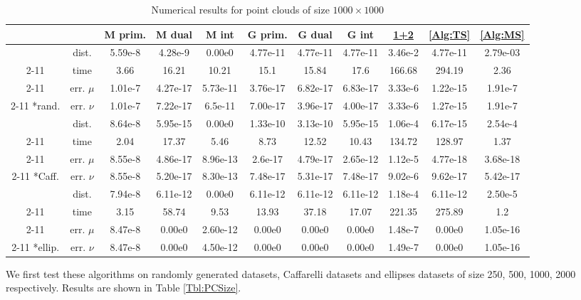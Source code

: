 \documentclass[english]{pkupaper}
\begin{document}
\begin{table}[htbp]
\centering \footnotesize
\begin{tabular}{|c|c|c|c|c|c|c|c|c|c|c|}
\hline
& & M prim. & M dual & M int & G prim. & G dual & G int & \hyperlink{EAlg:12}{1+2} & \ref{Alg:TS} & \ref{Alg:MS} \\ \hline
& dist. & 5.59e-8 & 4.28e-9 & 0.00e0 & 4.77e-11 & 4.77e-11 & 4.77e-11 & 3.46e-2 & 4.77e-11 & 2.79e-03 \\ \cline{2-11}
& time & 3.66 & 16.21 & 10.21 & 15.1 & 15.84 & 17.6 & 166.68 & 294.19 & 2.36 \\ \cline{2-11}
& err. $\mu$ & 1.01e-7 & 4.27e-17 & 5.73e-11 & 3.76e-17 & 6.82e-17 & 6.83e-17 & 3.33e-6 & 1.22e-15 & 1.91e-7 \\ \cline{2-11}
\multirow{-4}*{rand.} & err. $\nu$ & 1.01e-7 & 7.22e-17 & 6.5e-11 & 7.00e-17 & 3.96e-17 & 4.00e-17 & 3.33e-6 & 1.27e-15 & 1.91e-7 \\ \hline
& dist. & 8.64e-8 & 5.95e-15 & 0.00e0 & 1.33e-10 & 3.13e-10 & 5.95e-15 & 1.06e-4 & 6.17e-15 & 2.54e-4 \\ \cline{2-11}
& time & 2.04 & 17.37 & 5.46 & 8.73 & 12.52 & 10.43 & 134.72 & 128.97 & 1.37 \\ \cline{2-11}
& err. $\mu$ & 8.55e-8 & 4.86e-17 & 8.96e-13 & 2.6e-17 & 4.79e-17 & 2.65e-12 & 1.12e-5 & 4.77e-18 & 3.68e-18 \\ \cline{2-11}
\multirow{-4}*{Caff.} & err. $\nu$ & 8.55e-8 & 5.20e-17 & 8.30e-13 & 7.48e-17 & 5.31e-17 & 7.48e-17 & 9.02e-6 & 9.62e-17 & 5.42e-17 \\ \hline
& dist. & 7.94e-8 & 6.11e-12 & 0.00e0 & 6.11e-12 & 6.11e-12 & 6.11e-12 & 1.18e-4 & 6.11e-12 & 2.50e-5 \\ \cline{2-11}
& time & 3.15 & 58.74 & 9.53 & 13.93 & 37.18 & 17.07 & 221.35 & 275.89 & 1.2 \\ \cline{2-11}
& err. $\mu$ & 8.47e-8 & 0.00e0 & 2.60e-12 & 0.00e0 & 0.00e0 & 0.00e0 & 1.48e-7 & 0.00e0 & 1.05e-16 \\ \cline{2-11}
\multirow{-4}*{ellip.}& err. $\nu$ & 8.47e-8 & 0.00e0 & 4.50e-12 & 0.00e0 & 0.00e0 & 0.00e0 & 1.49e-7 & 0.00e0 & 1.05e-16 \\ \hline
\end{tabular}
\caption{Numerical results for point clouds of size $ 1000 \times 1000 $} \label{Tbl:PC1000}
\end{table}

We first test these algorithms on randomly generated datasets, Caffarelli datasets and ellipses datasets of size 250, 500, 1000, 2000 respectively. Results are shown in Table \ref{Tbl:PCSize}.
\end{document}
